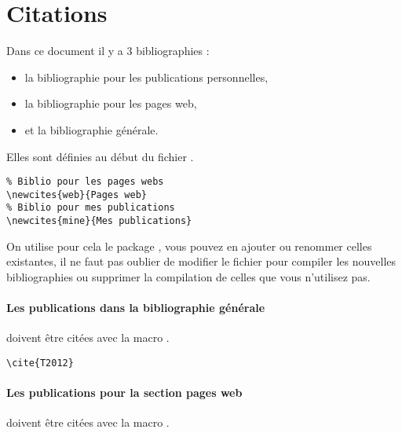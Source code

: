 \section{Citations}

Dans ce document il y a 3 bibliographies :
\begin{itemize}
  \item la bibliographie pour les publications personnelles,
  \item la bibliographie pour les pages web,
  \item et la bibliographie générale.
\end{itemize}

Elles sont définies au début du fichier .

\begin{framed}\vspace{-0.75em}
\begin{verbatim}
% Biblio pour les pages webs
\newcites{web}{Pages web}
% Biblio pour mes publications
\newcites{mine}{Mes publications}
\end{verbatim}\vspace{-0.75em}
\end{framed}

On utilise pour cela le package , vous pouvez en ajouter ou renommer celles existantes, il ne faut pas oublier de modifier le fichier  pour compiler les nouvelles bibliographies ou supprimer la compilation de celles que vous n'utilisez pas.

\paragraph{Les publications dans la bibliographie générale} doivent être citées avec la macro .

\begin{framed}
\noindent\cite{T2012}\vspace{-0.75em}
\begin{verbatim}\cite{T2012}\end{verbatim}\vspace{-0.75em}
\end{framed}

\paragraph{Les publications pour la section pages web} doivent être citées avec la macro .

